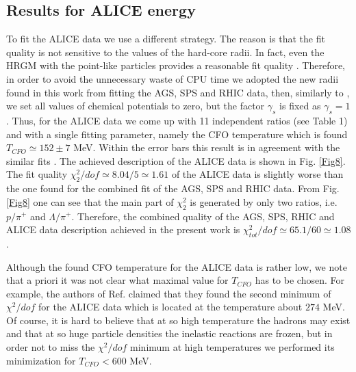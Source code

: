\documentclass[12pt]{article}
\begin{document}
\subsection{Results for ALICE energy}

To fit  the ALICE data   \cite{Abelev:2013vea,Abelev:2013zaa,Abelev:2013xaa,Knospe:2013tda,Adam:2015vda,Donigus:2015bsa,Adam:2015yta} we use a different strategy. The reason is that the fit quality is not sensitive to the values of the hard-core radii. In fact, even the HRGM with the  point-like particles provides a reasonable fit quality \cite{Bugaev:2016,Chaterjee15}.
Therefore, in order to avoid the unnecessary  waste of  CPU time we adopted the new radii found in this work from fitting the 
AGS, SPS and RHIC data, then, similarly to \cite{Stachel:2013zma},  we set all values of chemical potentials  to zero, but the factor  $\gamma_s$  is fixed as $\gamma_s=1$. Thus, for the ALICE data we come up with 11 independent ratios (see Table 1)
and with  a single fitting parameter, namely the CFO temperature
which is found $T_{CFO} \simeq 152 \pm 7$ MeV.  
 Within the error bars this result is in agreement with the similar fits \cite{Stachel:2013zma,Chaterjee15}.  
 The achieved description of the ALICE data is shown in Fig. \ref{Fig8}.  The fit quality $\chi^2_2/dof \simeq 8.04/5 \simeq 1.61$  of the ALICE data is slightly worse than the one found for the combined fit of the AGS, SPS and RHIC data. From  Fig. \ref{Fig8} 
 one can see that the main part of  $\chi^2_2$ is generated by only two ratios, i.e. ${p}/{\pi^+}$ and  ${\Lambda}/{\pi^+}$.
 Therefore, the combined quality of the AGS, SPS, RHIC and ALICE data description achieved in the present work  is  $\chi^2_{tot}/dof \simeq 65.1/60 \simeq 1.08$.
 

 Although the  found CFO temperature for the ALICE data is rather low, we note that a priori it was not clear what   maximal value  for $T_{CFO}$ has to be chosen. For example, the authors of Ref. \cite{Vovch15}  claimed that they found the second minimum  of  $\chi^2/dof$  for the ALICE data which is located at the temperature about $274$ MeV. 
 Of course, it is hard to believe  that at so high temperature the hadrons  may exist and that at so  huge particle  densities the inelastic reactions  are frozen, but  in order not to miss  the $\chi^2/dof$ minimum at  high temperatures  we performed  its minimization  for $T_{CFO} < 600$ MeV. 
 
\end{document}

